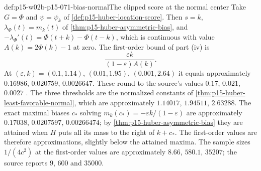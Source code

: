 \begin{hbexample}{def:p15-w02b-p15-071-bias-normal}{The clipped score at the normal center}
Take \(G=\Phi\) and \(\psi=\psi_k\) of
\cref{def:p15-huber-location-score}. Then \(s=k\),
\(\lambda_\Phi(t)=m_k(t)\) of \cref{thm:p15-huber-asymmetric-bias},
and \(-\lambda_\Phi'(t)=\Phi(t+k)-\Phi(t-k)\), which is continuous with
value \(A(k)=2\Phi(k)-1\) at zero. The first-order bound of part (iv) is
\[
 \frac{\varepsilon k}{(1-\varepsilon)A(k)} .
\]
At \((\varepsilon,k)=(0.1,1.14)\), \((0.01,1.95)\), \((0.001,2.64)\)
it equals approximately \(0.16986\), \(0.020759\), \(0.0026647\).
These round to the source's values \(0.17\), \(0.021\), \(0.0027\)
\cite[p.~83]{Huber1964RobustLocation}. The three thresholds are the
normalized constants of \cref{thm:p15-huber-least-favorable-normal},
which are approximately \(1.14017\), \(1.94511\), \(2.63288\).
The exact maximal biases \(c_*\) solving
\(m_k(c_*)=-\varepsilon k/(1-\varepsilon)\) are approximately
\(0.17038\), \(0.0207597\), \(0.00266474\); by
\cref{thm:p15-huber-asymmetric-bias} they are attained when \(H\) puts
all its mass to the right of \(k+c_*\). The first-order values are
therefore approximations, slightly below the attained maxima.
The sample sizes \(1/(4c^2)\) at the first-order values are approximately
\(8.66\), \(580.1\), \(35207\); the source reports \(9\), \(600\)
and \(35000\).
\end{hbexample}

